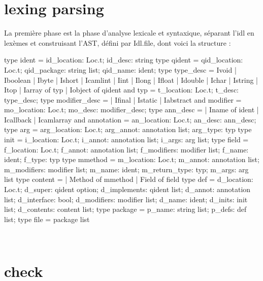 \documentclass[a4paper, 11pt]{report}
\begin{document}
\section{lexing parsing}
La première phase est la phase d'analyse lexicale et syntaxique,
séparant l'idl en lexèmes et construisant l'AST, défini par Idl.file,
dont voici la structure :
\newpage
\begin{multicols}{2}
\begin{OCaml}
type ident = {
    id_location: Loc.t;
    id_desc: string 
  }
type qident = {
    qid_location: Loc.t;
    qid_package: string list;
    qid_name: ident;
  }
type type_desc = 
    Ivoid  
  | Iboolean
  | Ibyte
  | Ishort
  | Icamlint
  | Iint
  | Ilong
  | Ifloat
  | Idouble
  | Ichar
  | Istring
  | Itop
  | Iarray of typ
  | Iobject of qident
and typ = {
    t_location: Loc.t;
    t_desc: type_desc;
  }
type modifier_desc = 
  | Ifinal 
  | Istatic 
  | Iabstract
and modifier = {
    mo_location: Loc.t; 
    mo_desc: modifier_desc;
}
type ann_desc =
  | Iname of ident
  | Icallback
  | Icamlarray
and annotation = {
    an_location: Loc.t; 
    an_desc: ann_desc;
}
type arg = {
    arg_location: Loc.t; 
    arg_annot: annotation list;
    arg_type: typ
}   
type init = {
    i_location: Loc.t;
    i_annot: annotation list; 
    i_args: arg list;
}   
type field = {
    f_location: Loc.t;
    f_annot: annotation list; 
    f_modifiers: modifier list;
    f_name: ident;
    f_type: typ
}
type mmethod = { 
    m_location: Loc.t;
    m_annot: annotation list;
    m_modifiers: modifier list;
    m_name: ident;
    m_return_type: typ;
    m_args: arg list
}
type content = 
    | Method of mmethod 
    | Field of field
type def = {
    d_location: Loc.t;
    d_super: qident option;
    d_implements: qident list;
    d_annot: annotation list;
    d_interface: bool;
    d_modifiers: modifier list;
    d_name: ident;
    d_inits: init list;
    d_contents: content list;
}
type package = {
    p_name: string list;
    p_defs: def list;
}   
type file = package list
 
\end{OCaml}
\end{multicols}
\ 
\newline
\section{check}
\end{document}
